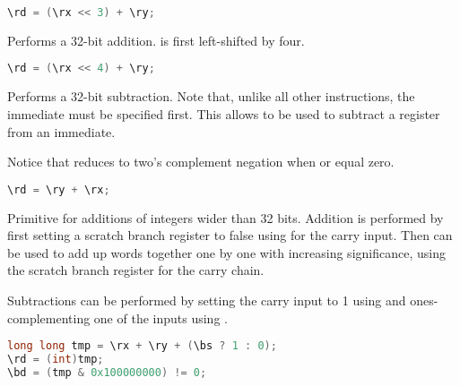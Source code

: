\begin{lstlisting}[numbers=none, basicstyle=\ttfamily\footnotesize, language=C++]
\rd = (\rx << 3) + \ry;
\end{lstlisting}

Performs a 32-bit addition. \code{\rx} is first left-shifted by four.

\begin{lstlisting}[numbers=none, basicstyle=\ttfamily\footnotesize, language=C++]
\rd = (\rx << 4) + \ry;
\end{lstlisting}

Performs a 32-bit subtraction. Note that, unlike all other instructions, the
immediate must be specified first. This allows  to be used to subtract
a register from an immediate.

Notice that  reduces to two's complement negation when  or
 equal zero.

\begin{lstlisting}[numbers=none, basicstyle=\ttfamily\footnotesize, language=C++]
\rd = \ry + \rx;
\end{lstlisting}

Primitive for additions of integers wider than 32 bits. Addition is performed by
first setting a scratch branch register to false using  for the carry
input. Then  can be used to add up words together one by one with
increasing significance, using the scratch branch register for the carry chain.

Subtractions can be performed by setting the carry input to 1 using 
and ones-complementing one of the inputs using .

\begin{lstlisting}[numbers=none, basicstyle=\ttfamily\footnotesize, language=C++]
long long tmp = \rx + \ry + (\bs ? 1 : 0);
\rd = (int)tmp;
\bd = (tmp & 0x100000000) != 0;
\end{lstlisting}

